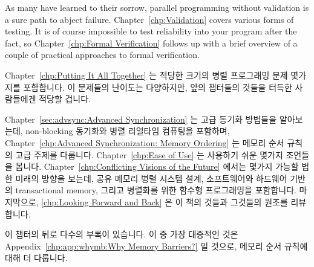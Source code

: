 As many have learned to their sorrow, parallel programming without
validation is a sure path to abject failure.
Chapter~\ref{chp:Validation} covers various forms of testing.
It is of course impossible to test reliability into your program
after the fact, so Chapter~\ref{chp:Formal Verification}
follows up with a brief overview of a couple of practical approaches to
formal verification.

\fi

Chapter~\ref{chp:Putting It All Together}
는 적당한 크기의 병렬 프로그래밍 문제 몇가지를 포함합니다.
이 문제들의 난이도는 다양하지만, 앞의 챕터들의 것들을 터득한 사람들에겐 적당할
겁니다.

Chapter~\ref{sec:advsync:Advanced Synchronization}
는 고급 동기화 방법들을 알아보는데, non-blocking 동기화와 병렬 리얼타임
컴퓨팅을 포함하며,
Chapter~\ref{chp:Advanced Synchronization: Memory Ordering} 는 메모리 순서
규칙의 고급 주제를 다룹니다.
Chapter~\ref{chp:Ease of Use} 는 사용하기 쉬운 몇가지 조언들을 봅니다.
Chapter~\ref{chp:Conflicting Visions of the Future}
에서는 몇가지 가능할 법한 미래의 방향을 보는데, 공유 메모리 병렬 시스템 설계,
소프트웨어와 하드웨어 기반의 transactional memory, 그리고 병렬화를 위한 함수형
프로그래밍을 포함합니다.
마지막으로, \cref{chp:Looking Forward and Back} 은 이 책의 것들과 그것들의
원조를 리뷰합니다.

\iffalse

Chapter~\ref{chp:Putting It All Together}
contains a series of moderate-sized parallel programming problems.
The difficulty of these problems vary, but should be appropriate for
someone who has mastered the material in the previous chapters.

Chapter~\ref{sec:advsync:Advanced Synchronization}
looks at advanced synchronization methods, including
non-blocking synchronization and parallel real-time computing,
while Chapter~\ref{chp:Advanced Synchronization: Memory Ordering}
covers the advanced topic of memory ordering.
Chapter~\ref{chp:Ease of Use} follows up with some ease-of-use advice.
Chapter~\ref{chp:Conflicting Visions of the Future}
looks at a few possible future directions, including
shared-memory parallel system design, software and hardware transactional
memory, and functional programming for parallelism.
Finally, \cref{chp:Looking Forward and Back} reviews the material in
this book and its origins.

\fi

이 챕터의 뒤로 다수의 부록이 있습니다.
이 중 가장 대중적인 것은 Appendix~\ref{chp:app:whymb:Why Memory Barriers?} 일
것으로, 메모리 순서 규칙에 대해 더 다룹니다.

